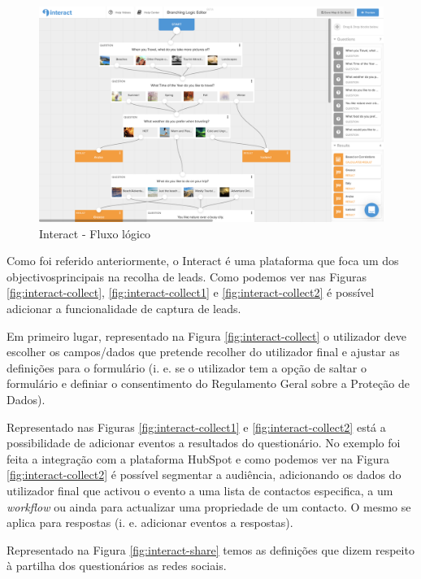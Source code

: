 \begin{figure}[ht!]
	\begin{center}
		\includegraphics[width=1\textwidth]{img/interact/logic}
		\caption{Interact - Fluxo lógico}
		\label{fig:interact-logic}
	\end{center}
\end{figure}

Como foi referido anteriormente, o Interact é uma plataforma que foca um dos objectivosprincipais na recolha de \gls{lead}s. Como podemos ver nas Figuras \ref{fig:interact-collect}, \ref{fig:interact-collect1} e \ref{fig:interact-collect2} é possível adicionar a funcionalidade de captura de leads. 

Em primeiro lugar, representado na Figura \ref{fig:interact-collect} o utilizador deve escolher os campos/dados que pretende recolher do utilizador final e ajustar as definições para o formulário (i. e. se o utilizador tem a opção de saltar o formulário e definiar o consentimento do Regulamento Geral sobre a Proteção de Dados). 

Representado nas Figuras \ref{fig:interact-collect1} e \ref{fig:interact-collect2} está a possibilidade de adicionar eventos a resultados do questionário. No exemplo foi feita a integração com a plataforma HubSpot e como podemos ver na Figura \ref{fig:interact-collect2} é possível segmentar a audiência, adicionando os dados do utilizador final que activou o evento a uma lista de contactos especifica, a um \textit{workflow} ou ainda para actualizar uma propriedade de um contacto. O mesmo se aplica para respostas (i. e. adicionar eventos a respostas).

Representado na Figura \ref{fig:interact-share} temos as definições que dizem respeito à partilha dos questionários as redes sociais.



